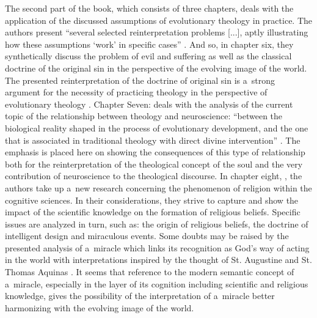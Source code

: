 The second part of the book, which consists of three chapters, deals with the application of the discussed assumptions of evolutionary theology in practice. The authors present ``several selected reinterpretation problems [...], aptly illustrating how these assumptions ‘work' in specific cases'' 
\parencite[][p.13]{grygiel_teologia_2022}. %
 And so, in chapter six,  
\parencite*[][pp.153–173]{} %
 they synthetically discuss the problem of evil and suffering as well as the classical doctrine of the original sin in the perspective of the evolving image of the world. The presented reinterpretation of the doctrine of original sin is a~strong argument for the necessity of practicing theology in the perspective of evolutionary theology 
\parencite*[][pp.168–170]{}. %
 Chapter Seven:  
\parencite*[][pp.174–196]{} %
 deals with the analysis of the current topic of the relationship between theology and neuroscience: ``between the biological reality shaped in the process of evolutionary development, and the one that is associated in traditional theology with direct divine intervention'' 
\parencite[][p.175]{grygiel_teologia_2022}. %
 The emphasis is placed here on showing the consequences of this type of relationship both for the reinterpretation of the theological concept of the soul and the very contribution of neuroscience to the theological discourse. In chapter eight,  
\parencite*[][pp.197–233]{}, %
 the authors take up a~new research concerning the phenomenon of religion within the cognitive sciences. In their considerations, they strive to capture and show the impact of the scientific knowledge on the formation of religious beliefs. Specific issues are analyzed in turn, such as: the origin of religious beliefs, the doctrine of intelligent design and miraculous events. Some doubts may be raised by the presented analysis of a~miracle which links its recognition as God's way of acting in the world with interpretations inspired by the thought of St. Augustine and St. Thomas Aquinas 
\parencite*[][pp.224–230]{}. %
 It seems that reference to the modern semantic concept of a~miracle, especially in the layer of its cognition including scientific and religious knowledge, gives the possibility of the interpretation of a~miracle better harmonizing with the evolving image of the world.



